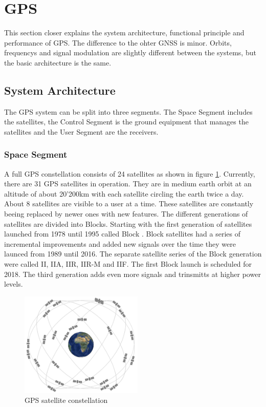 \section{GPS}

This section closer explains the system architecture, functional principle and performance of GPS.
The difference to the ohter GNSS is minor.
Orbits, frequencys and signal modulation are slightly different between the systems, but the basic architecture is the same.


\subsection{System Architecture}

The GPS system can be split into three segments.
The Space Segment includes the satellites, the Control Segment is the ground equipment that manages the satellites and the User Segment are the receivers.

\subsubsection{Space Segment}

A full GPS constellation consists of 24 satellites as shown in figure \ref{fig:constellation}.
Currently, there are 31 GPS satellites in operation.
They are in medium earth orbit at an altitude of about 20'200km with each satellite circling the earth twice a day.
About 8 satellites are visible to a user at a time.
These satellites are constantly beeing replaced by newer ones with new features.
The different generations of satellites are divided into Blocks.
Starting with the first generation of satellites launched from 1978 until 1995 called Block .
Block  satellites had a series of incremental improvements and added new signals over the time they were launced from 1989 until 2016.
The separate satellite series of the Block  generation were called II, IIA, IIR, IIR-M and IIF.
The first Block  launch is scheduled for 2018.
The third generation adds even more signals and trinsmitts at higher power levels.

\begin{figure}[ht]
 \centering
 \includegraphics[height=5cm]{images/constellation.jpg}
 \caption{GPS satellite constellation \cite{GPS_GOV}}
 \label{fig:constellation}
\end{figure}

